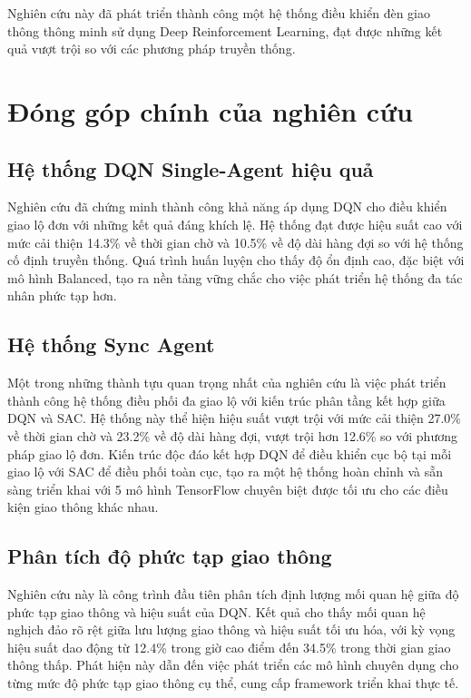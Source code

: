Nghiên cứu này đã phát triển thành công một hệ thống điều khiển đèn giao thông thông minh sử dụng Deep Reinforcement Learning, đạt được những kết quả vượt trội so với các phương pháp truyền thống.

\section{Đóng góp chính của nghiên cứu}

\subsection{Hệ thống DQN Single-Agent hiệu quả}
Nghiên cứu đã chứng minh thành công khả năng áp dụng DQN cho điều khiển giao lộ đơn với những kết quả đáng khích lệ. Hệ thống đạt được hiệu suất cao với mức cải thiện 14.3\% về thời gian chờ và 10.5\% về độ dài hàng đợi so với hệ thống cố định truyền thống. Quá trình huấn luyện cho thấy độ ổn định cao, đặc biệt với mô hình Balanced, tạo ra nền tảng vững chắc cho việc phát triển hệ thống đa tác nhân phức tạp hơn.

\subsection{Hệ thống Sync Agent}
Một trong những thành tựu quan trọng nhất của nghiên cứu là việc phát triển thành công hệ thống điều phối đa giao lộ với kiến trúc phân tầng kết hợp giữa DQN và SAC. Hệ thống này thể hiện hiệu suất vượt trội với mức cải thiện 27.0\% về thời gian chờ và 23.2\% về độ dài hàng đợi, vượt trội hơn 12.6\% so với phương pháp giao lộ đơn. Kiến trúc độc đáo kết hợp DQN để điều khiển cục bộ tại mỗi giao lộ với SAC để điều phối toàn cục, tạo ra một hệ thống hoàn chỉnh và sẵn sàng triển khai với 5 mô hình TensorFlow chuyên biệt được tối ưu cho các điều kiện giao thông khác nhau.

\subsection{Phân tích độ phức tạp giao thông}
Nghiên cứu này là công trình đầu tiên phân tích định lượng mối quan hệ giữa độ phức tạp giao thông và hiệu suất của DQN. Kết quả cho thấy mối quan hệ nghịch đảo rõ rệt giữa lưu lượng giao thông và hiệu suất tối ưu hóa, với kỳ vọng hiệu suất dao động từ 12.4\% trong giờ cao điểm đến 34.5\% trong thời gian giao thông thấp. Phát hiện này dẫn đến việc phát triển các mô hình chuyên dụng cho từng mức độ phức tạp giao thông cụ thể, cung cấp framework triển khai thực tế.

